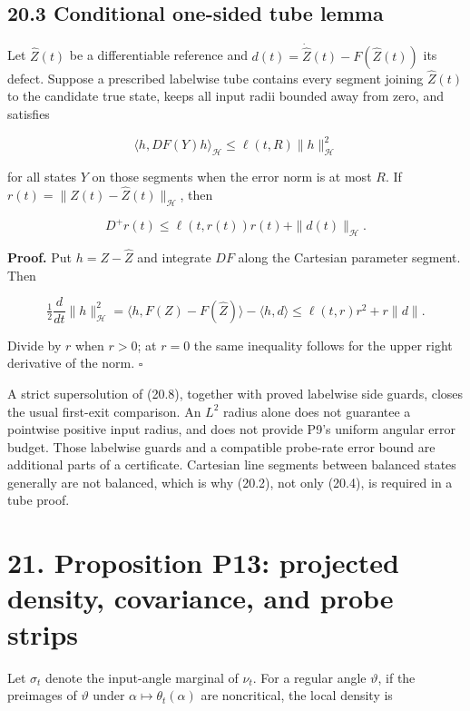 \documentclass[
  10pt,
]{article}
\begin{document}
\subsection{20.3 Conditional one-sided tube
lemma}\label{conditional-one-sided-tube-lemma}

Let \(\widehat Z(t)\) be a differentiable reference and
\(d(t)=\dot{\widehat Z}(t)-F(\widehat Z(t))\) its defect. Suppose a
prescribed labelwise tube contains every segment joining
\(\widehat Z(t)\) to the candidate true state, keeps all input radii
bounded away from zero, and satisfies

\[
 \langle h,DF(Y)h\rangle_{\mathcal H}
 \le\ell(t,R)\|h\|_{\mathcal H}^2
 \tag{20.7}
\]

for all states \(Y\) on those segments when the error norm is at most
\(R\). If \(r(t)=\|Z(t)-\widehat Z(t)\|_{\mathcal H}\), then

\[
 D^+r(t)\le\ell(t,r(t))r(t)+\|d(t)\|_{\mathcal H}.
 \tag{20.8}
\]

\textbf{Proof.} Put \(h=Z-\widehat Z\) and integrate \(DF\) along the
Cartesian parameter segment. Then

\[
 \tfrac12\frac d{dt}\|h\|_{\mathcal H}^2
 =\langle h,F(Z)-F(\widehat Z)\rangle-\langle h,d\rangle
 \le\ell(t,r)r^2+r\|d\|.
\]

Divide by \(r\) when \(r>0\); at \(r=0\) the same inequality follows for
the upper right derivative of the norm. \(\square\)

A strict supersolution of (20.8), together with proved labelwise side
guards, closes the usual first-exit comparison. An \(L^2\) radius alone
does not guarantee a pointwise positive input radius, and does not
provide P9's uniform angular error budget. Those labelwise guards and a
compatible probe-rate error bound are additional parts of a certificate.
Cartesian line segments between balanced states generally are not
balanced, which is why (20.2), not only (20.4), is required in a tube
proof.

\section{21. Proposition P13: projected density, covariance, and probe
strips}\label{proposition-p13-projected-density-covariance-and-probe-strips}

Let \(\sigma_t\) denote the input-angle marginal of \(\nu_t\). For a
regular angle \(\vartheta\), if the preimages of \(\vartheta\) under
\(\alpha\mapsto\theta_t(\alpha)\) are noncritical, the local density is
\end{document}
